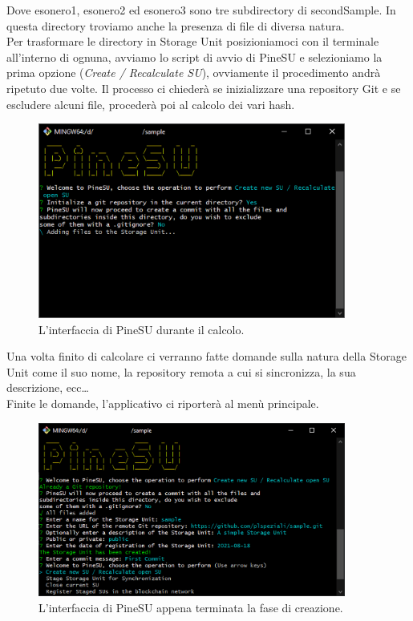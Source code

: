 Dove \textsf{esonero1}, \textsf{esonero2} ed \textsf{esonero3} sono tre subdirectory di \textsf{secondSample}.
In questa directory troviamo anche la presenza di file di diversa natura. \\


Per trasformare le directory in Storage Unit posizioniamoci con il terminale all’interno di ognuna,
avviamo lo script di avvio di PineSU e selezioniamo la prima opzione (\emph{Create / Recalculate SU}),
ovviamente il procedimento andrà ripetuto due volte.
Il processo ci chiederà se inizializzare una repository Git e se escludere alcuni file,
procederà poi al calcolo dei vari hash.

\begin{figure}[H]
    \centering
    \includegraphics[width=0.9\textwidth]{Figures/calculating}
    \caption{\small{
    L’interfaccia di PineSU durante il calcolo.
    } %
    } %
    \label{fi:calc}
\end{figure}


Una volta finito di calcolare ci verranno fatte domande sulla natura della Storage Unit come il suo nome,
la repository remota a cui si sincronizza, la sua descrizione, ecc\dots \\
Finite le domande, l’applicativo ci riporterà al menù principale.

\begin{figure}[H]
    \centering
    \includegraphics[width=0.9\textwidth]{Figures/doneCalculating}
    \caption{\small{
    L’interfaccia di PineSU appena terminata la fase di creazione.
    } %
    } %
    \label{fi:dcalc}
\end{figure}

